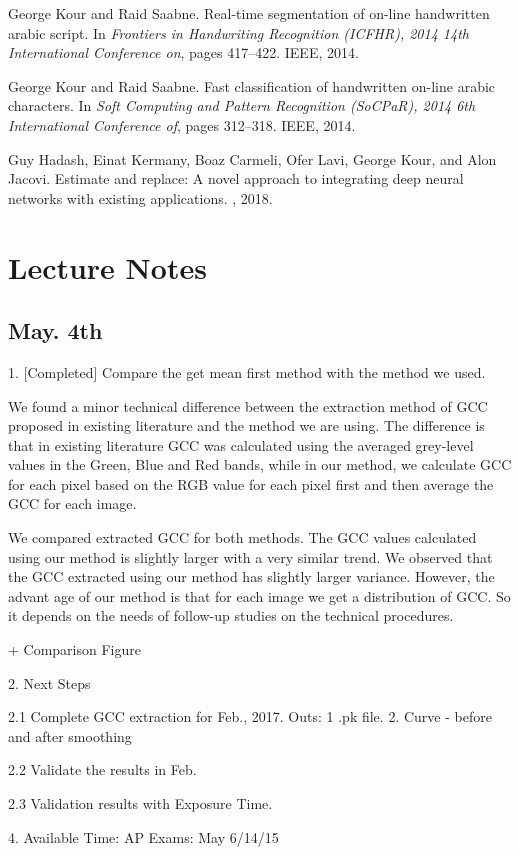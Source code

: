 \documentclass{article}
\begin{document}
\begin{thebibliography}{1}

George Kour and Raid Saabne.
\newblock Real-time segmentation of on-line handwritten arabic script.
\newblock In {\em Frontiers in Handwriting Recognition (ICFHR), 2014 14th
  International Conference on}, pages 417--422. IEEE, 2014.

George Kour and Raid Saabne.
\newblock Fast classification of handwritten on-line arabic characters.
\newblock In {\em Soft Computing and Pattern Recognition (SoCPaR), 2014 6th
  International Conference of}, pages 312--318. IEEE, 2014.

Guy Hadash, Einat Kermany, Boaz Carmeli, Ofer Lavi, George Kour, and Alon
  Jacovi.
\newblock Estimate and replace: A novel approach to integrating deep neural
  networks with existing applications.
, 2018.

\end{thebibliography}


\section{Lecture Notes}

\subsection{May. 4th}
1. [Completed] Compare the get mean first method with the method we used.

We found a minor technical difference between  the extraction method of GCC proposed in existing literature and the method we are using. The difference is that in existing literature GCC was calculated using the averaged grey-level values in the Green, Blue and Red bands, while in our method, we calculate GCC for each pixel based on the RGB value for each pixel first and then average the GCC for each image.

We compared extracted GCC for both methods. The GCC values calculated using our method is slightly larger with a very similar trend. We observed that the GCC extracted using our method has slightly larger variance. However, the advant   age of our method is that for each image we get a distribution of GCC. So it depends on the needs of follow-up studies on the technical procedures.  

+ Comparison Figure


2. Next Steps

2.1 Complete GCC extraction for Feb., 2017.
Outs: 1 .pk file.  2. Curve - before and after smoothing

2.2 Validate the results in Feb.

2.3 Validation results with Exposure Time.  





4. Available Time: AP Exams: May 6/14/15
\end{document}
